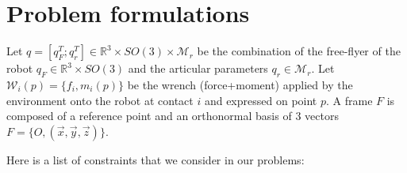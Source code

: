 
\section{Problem formulations}
\label{sec:problem_formulations}

Let $q=[q_F^T; q_r^T]\in\mathbb{R}^3\times SO(3)\times \mathcal{M}_r$ be the combination of the free-flyer of the robot $q_F\in \mathbb{R}^3 \times SO(3)$ and the articular parameters $q_r\in\mathcal{M}_r$.
Let $\mathcal{W}_i(p)=\{f_i,m_i(p)\}$ be the wrench (force+moment) applied by the environment onto the robot at contact $i$ and expressed on point $p$.
A frame $F$ is composed of a reference point and an orthonormal basis of 3 vectors $F = \{O, (\vec{x}, \vec{y}, \vec{z})\}$.

Here is a list of constraints that we consider in our problems:

